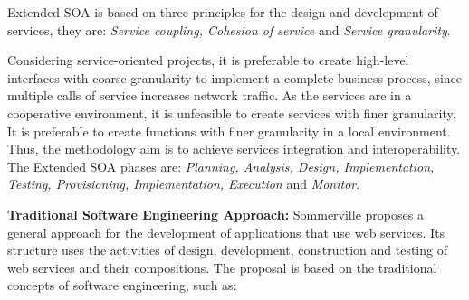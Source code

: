Extended SOA is based on three principles for the design and development of
services, they are: \textit{Service coupling, Cohesion of service}
and \textit{Service granularity}.

Considering service-oriented projects, it is preferable to create high-level
interfaces with coarse granularity to implement a complete business process,
since multiple calls of service increases network traffic.
As the services are in a cooperative environment, it is unfeasible to create
services with finer granularity. It is preferable to create functions with
finer granularity in a local environment. Thus, the methodology aim is to
achieve services integration and interoperability. The Extended SOA phases are:
\textit{Planning, Analysis, Design, Implementation, Testing,
Provisioning, Implementation, Execution} and \textit{Monitor}.

% 
% 
% 
% 

\bigskip
\textbf{Traditional Software Engineering Approach:} Sommerville
\cite{sommerville08} proposes a general approach for the development of applications that use web services. Its
structure uses the activities of design, development, construction and testing of web services and their
compositions. The proposal is based on the traditional concepts of software
engineering, such as:
 
